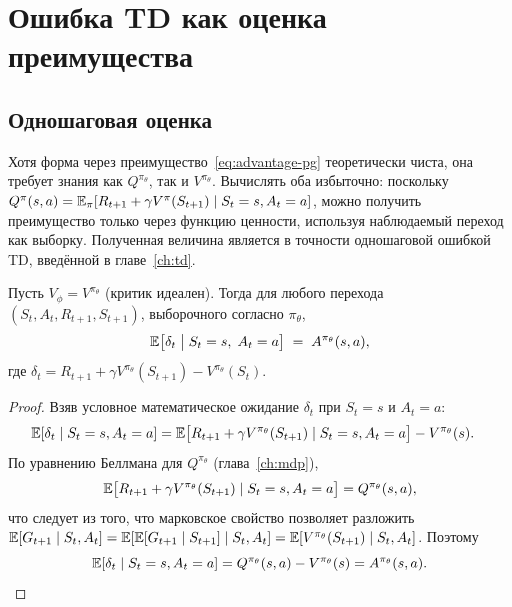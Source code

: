 \section{Ошибка TD как оценка преимущества}
\label{sec:td-error-advantage}

\subsection{Одношаговая оценка}

Хотя форма через преимущество~\eqref{eq:advantage-pg} теоретически чиста, она требует знания как $Q^{\pi_\theta}$, так и $V^{\pi_\theta}$. Вычислять оба избыточно: поскольку $Q^\pi(s,a) = \operatorname{\mathbb{E}}_\pi[R_{t+1} + \gamma V^\pi(S_{t+1}) \mid S_t=s, A_t=a]$, можно получить преимущество только через функцию ценности, используя наблюдаемый переход как выборку. Полученная величина является в точности одношаговой ошибкой TD, введённой в главе~\ref{ch:td}.

\begin{theorem}
\label{thm:td-error-advantage}
Пусть $V_\phi = V^{\pi_\theta}$ (критик идеален). Тогда для любого перехода $(S_t, A_t, R_{t+1}, S_{t+1})$, выборочного согласно $\pi_\theta$,
\begin{equation}
\label{eq:td-as-advantage}
\operatorname{\mathbb{E}}\bigl[\delta_t \;\big|\; S_t = s,\; A_t = a\bigr]
\;=\; A^{\pi_\theta}(s, a),
\end{equation}
где $\delta_t = R_{t+1} + \gamma V^{\pi_\theta}(S_{t+1}) - V^{\pi_\theta}(S_t)$.
\end{theorem}

\begin{proof}
Взяв условное математическое ожидание $\delta_t$ при $S_t = s$ и $A_t = a$:
\begin{align*}
\operatorname{\mathbb{E}}[\delta_t \mid S_t = s, A_t = a]
&= \operatorname{\mathbb{E}}\bigl[R_{t+1} + \gamma V^{\pi_\theta}(S_{t+1}) \mid S_t=s, A_t=a\bigr]
   - V^{\pi_\theta}(s).
\end{align*}
По уравнению Беллмана для $Q^{\pi_\theta}$ (глава~\ref{ch:mdp}),
\[
\operatorname{\mathbb{E}}\bigl[R_{t+1} + \gamma V^{\pi_\theta}(S_{t+1}) \mid S_t=s, A_t=a\bigr]
= Q^{\pi_\theta}(s, a),
\]
что следует из того, что марковское свойство позволяет разложить $\operatorname{\mathbb{E}}[G_{t+1} \mid S_t, A_t] = \operatorname{\mathbb{E}}[\operatorname{\mathbb{E}}[G_{t+1} \mid S_{t+1}] \mid S_t, A_t] = \operatorname{\mathbb{E}}[V^{\pi_\theta}(S_{t+1}) \mid S_t, A_t]$.
Поэтому
\[
\operatorname{\mathbb{E}}[\delta_t \mid S_t=s, A_t=a]
= Q^{\pi_\theta}(s,a) - V^{\pi_\theta}(s)
= A^{\pi_\theta}(s,a). \qedhere
\]
\end{proof}

